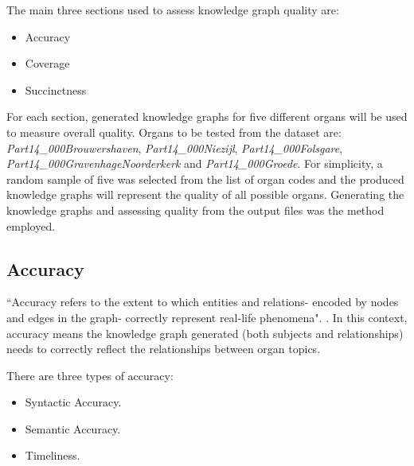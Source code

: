 The main three sections used to assess knowledge graph quality are: 

\vspace{-0.2cm}
\begin{itemize}
    \itemsep0em 
    \item Accuracy
    \vspace{-0.15cm}
    \item Coverage
    \vspace{-0.15cm}
    \item Succinctness
\end{itemize}
\vspace{-0.1cm}

For each section, generated knowledge graphs for five different organs will be used to measure overall quality. Organs to be tested from the dataset are: \textit{Part14\_000Brouwershaven}, \textit{Part14\_000Niezijl}, \textit{Part14\_000Folsgare}, \textit{Part14\_000GravenhageNoorderkerk} and \textit{Part14\_000Groede}. For simplicity, a random sample of five was selected from the list of organ codes and the produced knowledge graphs will represent the quality of all possible organs. Generating the knowledge graphs and assessing quality from the output files was the method employed. 

\subsection{Accuracy}
\hspace{0.5cm} ``Accuracy refers to the extent to which entities and relations- encoded by nodes and edges in the graph- correctly represent real-life phenomena". \cite{knowledgegraphevaulationbook}. In this context, accuracy means the knowledge graph generated (both subjects and relationships) needs to correctly reflect the relationships between organ topics. 

There are three types of accuracy: 

\vspace{-0.2cm}
\begin{itemize}
    \itemsep0em 
\item Syntactic Accuracy.
\vspace{-0.1cm}
\item Semantic Accuracy.
\vspace{-0.1cm}
\item Timeliness.
\end{itemize}
\vspace{-0.4cm}

